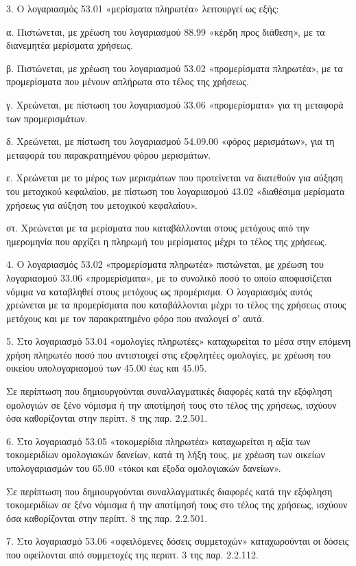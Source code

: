 \documentclass[A4,10pt,greek]{book}
\begin{document}
3. Ο λογαριασμός 53.01 «μερίσματα πληρωτέα» λειτουργεί ως εξής:

α. Πιστώνεται, με χρέωση του λογαριασμού 88.99 «κέρδη προς διάθεση», με τα διανεμητέα μερίσματα χρήσεως.

β. Πιστώνεται, με χρέωση του λογαριασμού 53.02 «προμερίσματα πληρωτέα», με τα προμερίσματα που μένουν απλήρωτα στο τέλος της χρήσεως.

γ. Χρεώνεται, με πίστωση του λογαριασμού 33.06 «προμερίσματα» για τη μεταφορά των προμερισμάτων.

δ. Χρεώνεται, με πίστωση του λογαριασμού 54.09.00 «φόρος μερισμάτων», για τη μεταφορά του παρακρατημένου φόρου μερισμάτων.

ε. Χρεώνεται με το μέρος των μερισμάτων που προτείνεται να διατεθούν για αύξηση του μετοχικού κεφαλαίου, με πίστωση του λογαριασμού 43.02 «διαθέσιμα μερίσματα χρήσεως για αύξηση του μετοχικού κεφαλαίου».

στ. Χρεώνεται με τα μερίσματα που καταβάλλονται στους μετόχους από την ημερομηνία που αρχίζει η πληρωμή του μερίσματος μέχρι το τέλος της χρήσεως.

4. Ο λογαριασμός 53.02 «προμερίσματα πληρωτέα» πιστώνεται, με χρέωση του λογαριασμού 33.06 «προμερίσματα», με το συνολικό ποσό το οποίο αποφασίζεται νόμιμα να καταβληθεί στους μετόχους ως προμέρισμα. Ο λογαριασμός αυτός χρεώνεται με τα προμερίσματα που καταβάλλονται μέχρι το τέλος της χρήσεως στους μετόχους και με τον παρακρατημένο φόρο που αναλογεί σ' αυτά.

5. Στο λογαριασμό 53.04 «ομολογίες πληρωτέες» καταχωρείται το μέσα στην επόμενη χρήση πληρωτέο ποσό που αντιστοιχεί στις εξοφλητέες ομολογίες, με χρέωση του οικείου υπολογαριασμού των 45.00 έως και 45.05.

Σε περίπτωση που δημιουργούνται συναλλαγματικές διαφορές κατά την εξόφληση ομολογιών σε ξένο νόμισμα ή την αποτίμησή τους στο τέλος της χρήσεως, ισχύουν όσα καθορίζονται στην περίπτ. 8 της παρ. 2.2.501.

6. Στο λογαριασμό 53.05 «τοκομερίδια πληρωτέα» καταχωρείται η αξία των τοκομεριδίων ομολογιακών δανείων, κατά τη λήξη τους, με χρέωση των οικείων υπολογαριασμών του 65.00 «τόκοι και έξοδα ομολογιακών δανείων».

Σε περίπτωση που δημιουργούνται συναλλαγματικές διαφορές κατά την εξόφληση τοκομεριδίων σε ξένο νόμισμα ή την αποτίμησή τους στο τέλος της χρήσεως, ισχύουν όσα καθορίζονται στην περίπτ. 8 της παρ. 2.2.501.

7. Στο λογαριασμό 53.06 «οφειλόμενες δόσεις συμμετοχών» καταχωρούνται οι δόσεις που οφείλονται από συμμετοχές της περιπτ. 3 της παρ. 2.2.112.
\end{document}

